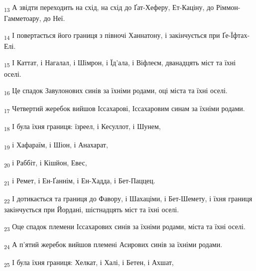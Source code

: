 \begin{tcolorbox}
\textsubscript{13} А звідти переходить на схід, на схід до Ґат-Хеферу, Ет-Каціну, до Ріммон-Гамметоару, до Неї.
\end{tcolorbox}
\begin{tcolorbox}
\textsubscript{14} І повертається його границя з півночі Ханнатону, і закінчується при Ґе-Їфтах-Елі.
\end{tcolorbox}
\begin{tcolorbox}
\textsubscript{15} І Каттат, і Нагалал, і Шімрон, і Їд'ала, і Віфлеєм, дванадцять міст та їхні оселі.
\end{tcolorbox}
\begin{tcolorbox}
\textsubscript{16} Це спадок Завулонових синів за їхніми родами, оці міста та їхні оселі.
\end{tcolorbox}
\begin{tcolorbox}
\textsubscript{17} Четвертий жеребок вийшов Іссахарові, Іссахаровим синам за їхніми родами.
\end{tcolorbox}
\begin{tcolorbox}
\textsubscript{18} І була їхня границя: їзреел, і Кесуллот, і Шунем,
\end{tcolorbox}
\begin{tcolorbox}
\textsubscript{19} і Хафараїм, і Шіон, і Анахарат,
\end{tcolorbox}
\begin{tcolorbox}
\textsubscript{20} і Раббіт, і Кішйон, Евес,
\end{tcolorbox}
\begin{tcolorbox}
\textsubscript{21} і Ремет, і Ен-Ґаннім, і Ен-Хадда, і Бет-Паццец.
\end{tcolorbox}
\begin{tcolorbox}
\textsubscript{22} І дотикається та границя до Фавору, і Шахаціми, і Бет-Шемету, і їхня границя закінчується при Йордані, шістнадцять міст та їхні оселі.
\end{tcolorbox}
\begin{tcolorbox}
\textsubscript{23} Оце спадок племени Іссахарових синів за їхніми родами, міста та їхні оселі.
\end{tcolorbox}
\begin{tcolorbox}
\textsubscript{24} А п'ятий жеребок вийшов племені Асирових синів за їхніми родами.
\end{tcolorbox}
\begin{tcolorbox}
\textsubscript{25} І була їхня границя: Хелкат, і Халі, і Бетен, і Ахшат,
\end{tcolorbox}

